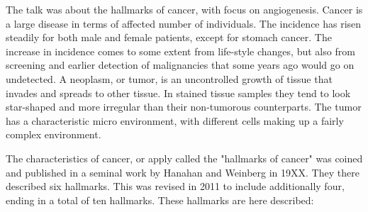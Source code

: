 \documentclass[12p]{article}
\begin{document}
The talk was about the hallmarks of cancer, with focus on angiogenesis.
Cancer is a large disease in terms of affected number of individuals.
The incidence has risen steadily for both male and female patients, except for stomach cancer.
The increase in incidence comes to some extent from life-style changes, but also from screening and earlier detection of malignancies that some years ago would go on undetected.
A neoplasm, or tumor, is an uncontrolled growth of tissue that invades and spreads to other tissue.
In stained tissue samples they tend to look star-shaped and more irregular than their non-tumorous counterparts.
The tumor has a characteristic micro environment, with different cells making up a fairly complex environment.

The characteristics of cancer, or apply called the "hallmarks of cancer" was coined and published in a seminal work by Hanahan and Weinberg in 19XX.
They there described six hallmarks.
This was revised in 2011 to include additionally four, ending in a total of ten hallmarks.
These hallmarks are here described:
\end{document}
